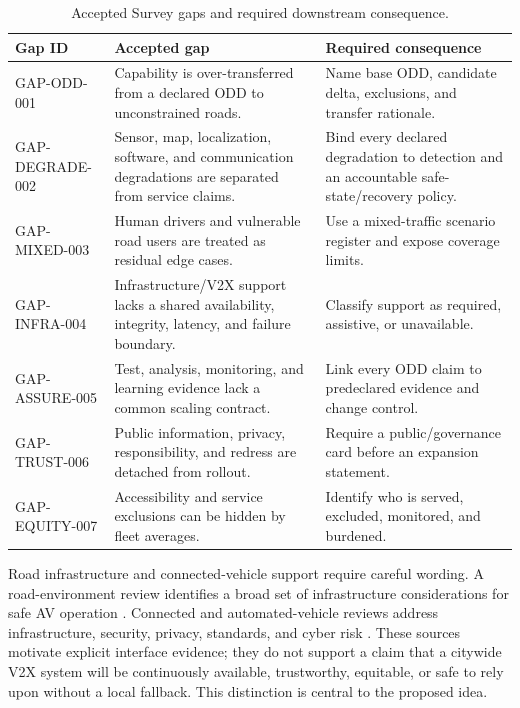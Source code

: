 \documentclass[conference]{../../../../Conference-LaTeX-template_10-17-19/IEEEtran}
\begin{document}
\begin{table}[!t]
\caption{Accepted Survey gaps and required downstream consequence.}
\label{tab:gaps}
\centering
\small
\begin{tabularx}{\textwidth}{lY Y}
\toprule
Gap ID & Accepted gap & Required consequence \\
\midrule
GAP-ODD-001 & Capability is over-transferred from a declared ODD to unconstrained roads. & Name base ODD, candidate delta, exclusions, and transfer rationale. \\
GAP-DEGRADE-002 & Sensor, map, localization, software, and communication degradations are separated from service claims. & Bind every declared degradation to detection and an accountable safe-state/recovery policy. \\
GAP-MIXED-003 & Human drivers and vulnerable road users are treated as residual edge cases. & Use a mixed-traffic scenario register and expose coverage limits. \\
GAP-INFRA-004 & Infrastructure/V2X support lacks a shared availability, integrity, latency, and failure boundary. & Classify support as required, assistive, or unavailable. \\
GAP-ASSURE-005 & Test, analysis, monitoring, and learning evidence lack a common scaling contract. & Link every ODD claim to predeclared evidence and change control. \\
GAP-TRUST-006 & Public information, privacy, responsibility, and redress are detached from rollout. & Require a public/governance card before an expansion statement. \\
GAP-EQUITY-007 & Accessibility and service exclusions can be hidden by fleet averages. & Identify who is served, excluded, monitored, and burdened. \\
\bottomrule
\end{tabularx}
\end{table}

Road infrastructure and connected-vehicle support require careful wording. A road-environment review identifies a broad set of infrastructure considerations for safe AV operation \cite{tengilimoglu_etal_2023}. Connected and automated-vehicle reviews address infrastructure, security, privacy, standards, and cyber risk \cite{sadaf_etal_2023}. These sources motivate explicit interface evidence; they do not support a claim that a citywide V2X system will be continuously available, trustworthy, equitable, or safe to rely upon without a local fallback. This distinction is central to the proposed idea.
\end{document}
